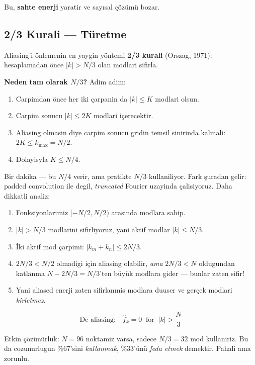 Bu, \textbf{sahte enerji} yaratir ve say\i{}sal çözümü bozar.

\subsection{2/3 Kurali --- Türetme}
\label{subsec:twothirds}

Aliasing'i önlemenin en yaygin yöntemi \textbf{2/3 kurali} (Orszag, 1971): hesaplamadan önce $|k| > N/3$ olan modlari sifirla.

\textbf{Neden tam olarak $N/3$?} Adim adim:

\begin{enumerate}
\item Carpimdan önce her iki çarpanin da $|k| \leq K$ modlari olsun.
\item Carpim sonucu $|k| \leq 2K$ modlari içerecektir.
\item Aliasing olmasin diye carpim sonucu gridin temsil sinirinda kalmali: $2K \leq k_{\max} = N/2$.
\item Dolayisyla $K \leq N/4$.
\end{enumerate}

Bir dakika --- bu $N/4$ verir, ama pratikte $N/3$ kullaniliyor. Fark şuradan gelir: padded convolution ile degil, \emph{truncated} Fourier uzayinda çalisiyoruz. Daha dikkatli analiz:

\begin{enumerate}
\item Fonksiyonlarimiz $[-N/2, N/2)$ arasinda modlara sahip.
\item $|k| > N/3$ modlarini sifirliyoruz, yani aktif modlar $|k| \leq N/3$.
\item İki aktif mod çarpimi: $|k_m + k_n| \leq 2N/3$.
\item $2N/3 < N/2$ olmadigi için aliasing olabilir, \emph{ama} $2N/3 < N$ oldugundan katlanma $N - 2N/3 = N/3$'ten büyük modlara gider --- bunlar zaten sifir!
\item Yani aliased enerji zaten sifirlanmis modlara duuser ve gerçek modlari \emph{kirletmez}.
\end{enumerate}

\begin{equation}
\boxed{\text{De-aliasing:}\quad \hat{f}_k = 0 \;\;\text{for}\;\; |k| > \frac{N}{3}}
\label{eq:dealias_rule}
\end{equation}

\begin{remark}
Etkin çözünürlük: $N = 96$ noktamiz varsa, sadece $N/3 = 32$ mod kullaniriz. Bu da cozunurlugun \%67'sini \emph{kullanmak}, \%33'ünü \emph{feda etmek} demektir. Pahali ama zorunlu.
\end{remark}


